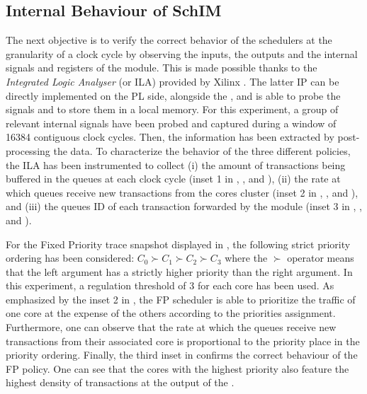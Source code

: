 \subsection{Internal Behaviour of SchIM}
\label{subsec:internal-behaviour-of-schim}
The next objective is to verify the correct behavior of the schedulers
at the granularity of a clock cycle by observing the inputs,
the outputs and the internal signals and registers of the \schim
module. This is made possible thanks to the \emph{Integrated Logic
  Analyser} (or ILA) provided by Xilinx \cite{Xilinx-ILA}. The latter
IP can be directly implemented on the PL side, alongside the \schim,
and is able to probe the signals and to store them in a local
memory. For this experiment, a group of relevant internal signals have
been probed and captured during a window of 16384 contiguous clock
cycles. Then, the information has been extracted by post-processing
the data. To characterize the behavior of the three different
policies, the ILA has been instrumented to collect (i) the amount of
transactions being buffered in the queues at each clock cycle (inset 1
in , , and
), (ii) the rate at which queues receive
new transactions from the cores cluster (inset 2 in
, , and
), and (iii) the queues ID of each
transaction forwarded by the \schim module (inset 3 in
, , and
).

For the Fixed Priority trace snapshot displayed in
, the following strict priority ordering
has been considered: $C_{0} \succ C_{1} \succ C_{2} \succ C_{3}$ where
the $\succ$ operator means that the left argument has a strictly
higher priority than the right argument. In this experiment, a
regulation threshold of 3 for each core has been used.  As emphasized
by the inset 2 in , the FP scheduler is
able to prioritize the traffic of one core at the expense of the
others according to the priorities assignment. Furthermore, one can
observe that the rate at which the queues receive new transactions
from their associated core is proportional to the priority place in
the priority ordering.  Finally, the third inset in
 confirms the correct behaviour of the FP
policy.%
One can see that the cores with the highest priority also feature the
highest density of transactions at the output of the \schim.

